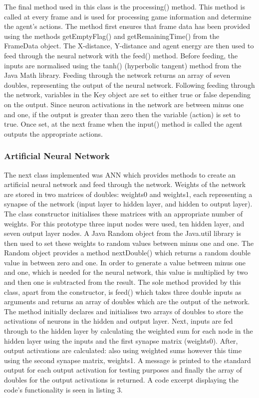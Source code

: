 \documentclass[12pt,a4paper]{article}
\begin{document}
The final method used in this class is the processing() method. This method is called at every frame and is used for processing game information and determine the agent's actions. The method first ensures that frame data has been provided using the methods getEmptyFlag() and getRemainingTime() from the FrameData object. The X-distance, Y-distance and agent energy are then used to feed through the neural network with the feed() method. Before feeding, the inputs are normalised using the tanh() (hyperbolic tangent) method from the Java Math library. Feeding through the network returns an array of seven doubles, representing the output of the neural network. Following feeding through the network, variables in the Key object are set to either true or false depending on the output. Since neuron activations in the network are between minus one and one, if the output is greater than zero then the variable (action) is set to true. Once set, at the next frame when the input() method is called the agent outputs the appropriate actions.\\

\subsubsection*{Artificial Neural Network}

The next class implemented was ANN which provides methods to create an artificial neural network and feed through the network. Weights of the network are stored in two matrices of doubles: weights0 and weights1, each representing a synapse of the network (input layer to hidden layer, and hidden to output layer).\\

The class constructor initialises these matrices with an appropriate number of weights. For this prototype three input nodes were used, ten hidden layer, and seven output layer nodes. A Java Random object from the Java.util library is then used to set these weights to random values between minus one and one. The Random object provides a method nextDouble() which returns a random double value in between zero and one. In order to generate a value between minus one and one, which is needed for the neural network, this value is multiplied by two and then one is subtracted from the result.
\newpage
The sole method provided by this class, apart from the constructor, is feed() which takes three double inputs as arguments and returns an array of doubles which are the output of the network. The method initially declares and initialises two arrays of doubles to store the activations of neurons in the hidden and output layer. Next, inputs are fed through to the hidden layer by calculating the weighted sum for each node in the hidden layer using the inputs and the first synapse matrix (weights0). After, output activations are calculated: also using weighted sums however this time using the second synapse matrix, weights1. A message is printed to the standard output for each output activation for testing purposes and finally the array of doubles for the output activations is returned. A code excerpt displaying the code's functionality is seen in listing 3.
\end{document}
